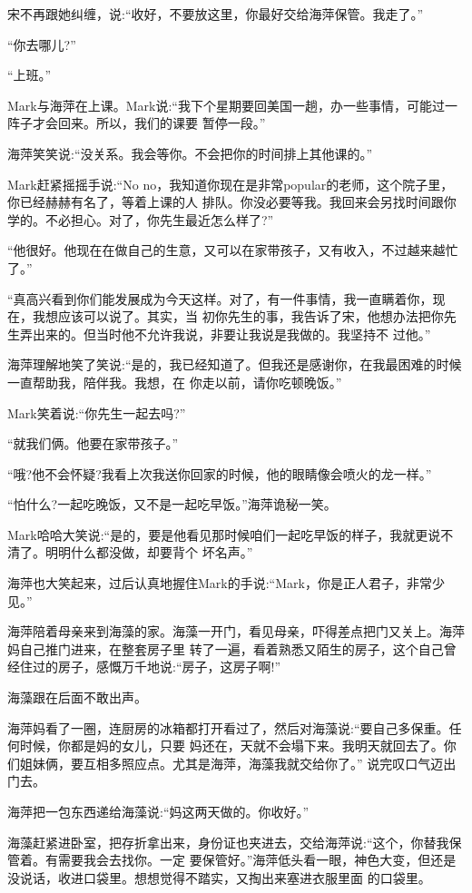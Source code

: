 \documentclass[11pt,a4paper,onecolumn]{article}
\begin{document}
宋不再跟她纠缠，说:``收好，不要放这里，你最好交给海萍保管。我走了。''

``你去哪儿?''

``上班。''

Mark与海萍在上课。Mark说:``我下个星期要回美国一趟，办一些事情，可能过一阵子才会回来。所以，我们的课要
暂停一段。''

海萍笑笑说:``没关系。我会等你。不会把你的时间排上其他课的。''

Mark赶紧摇摇手说:``No no，我知道你现在是非常popular的老师，这个院子里，你已经赫赫有名了，等着上课的人
排队。你没必要等我。我回来会另找时间跟你学的。不必担心。对了，你先生最近怎么样了?''

``他很好。他现在在做自己的生意，又可以在家带孩子，又有收入，不过越来越忙了。''

``真高兴看到你们能发展成为今天这样。对了，有一件事情，我一直瞒着你，现在，我想应该可以说了。其实，当
初你先生的事，我告诉了宋，他想办法把你先生弄出来的。但当时他不允许我说，非要让我说是我做的。我坚持不
过他。''

海萍理解地笑了笑说:``是的，我已经知道了。但我还是感谢你，在我最困难的时候一直帮助我，陪伴我。我想，在
你走以前，请你吃顿晚饭。''

Mark笑着说:``你先生一起去吗?''

``就我们俩。他要在家带孩子。''

``哦?他不会怀疑?我看上次我送你回家的时候，他的眼睛像会喷火的龙一样。''

``怕什么?一起吃晚饭，又不是一起吃早饭。''海萍诡秘一笑。

Mark哈哈大笑说:``是的，要是他看见那时候咱们一起吃早饭的样子，我就更说不清了。明明什么都没做，却要背个
坏名声。''

海萍也大笑起来，过后认真地握住Mark的手说:``Mark，你是正人君子，非常少见。''

海萍陪着母亲来到海藻的家。海藻一开门，看见母亲，吓得差点把门又关上。海萍妈自己推门进来，在整套房子里
转了一遍，看着熟悉又陌生的房子，这个自己曾经住过的房子，感慨万千地说:``房子，这房子啊!''

海藻跟在后面不敢出声。

海萍妈看了一圈，连厨房的冰箱都打开看过了，然后对海藻说:``要自己多保重。任何时候，你都是妈的女儿，只要
妈还在，天就不会塌下来。我明天就回去了。你们姐妹俩，要互相多照应点。尤其是海萍，海藻我就交给你了。''
说完叹口气迈出门去。

海萍把一包东西递给海藻说:``妈这两天做的。你收好。''

海藻赶紧进卧室，把存折拿出来，身份证也夹进去，交给海萍说:``这个，你替我保管着。有需要我会去找你。一定
要保管好。''海萍低头看一眼，神色大变，但还是没说话，收进口袋里。想想觉得不踏实，又掏出来塞进衣服里面
的口袋里。
\end{document}
